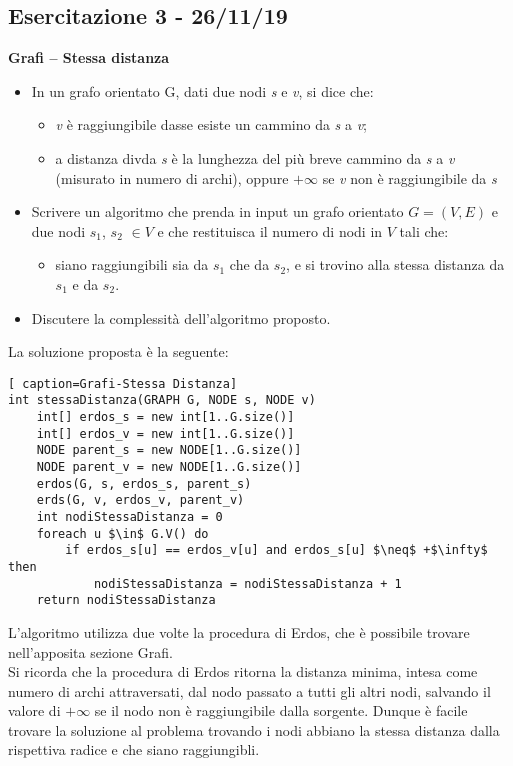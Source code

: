 \documentclass[../cheatSheetAlgoritmi.tex]{subfiles}
\begin{document}
\subsection{Esercitazione 3 - 26/11/19}
\textbf{Grafi – Stessa distanza} \\
\begin{itemize}
\item In un grafo orientato G, dati due nodi \textit{s} e \textit{v}, si dice che:
	\begin{itemize}
		\item \textit{v} è raggiungibile dasse esiste un cammino da \textit{s} a \textit{v};
		\item a distanza divda \textit{s} è la lunghezza del più breve cammino da \textit{s} a \textit{v} (misurato in numero di archi), oppure $+\infty$ se \textit{v} non è raggiungibile da \textit{s}
	\end{itemize}
	
	\item Scrivere un algoritmo che prenda in input un grafo orientato $G=(V, E)$ e due nodi $s_1$, $s_2$ $\in V$ e che restituisca il numero di nodi in $V$ tali che:
	\begin{itemize}
		\item siano raggiungibili sia da $s_1$ che da $s_2$, e si trovino alla stessa distanza da $s_1$ e da $s_2$.
	\end{itemize}
	\item Discutere la complessità dell’algoritmo proposto.
\end{itemize}
La soluzione proposta è la seguente:
\begin{lstlisting}[ caption=Grafi-Stessa Distanza]
int stessaDistanza(GRAPH G, NODE s, NODE v)
	int[] erdos_s = new int[1..G.size()]
  	int[] erdos_v = new int[1..G.size()]
  	NODE parent_s = new NODE[1..G.size()]
 	NODE parent_v = new NODE[1..G.size()]
 	erdos(G, s, erdos_s, parent_s)
 	erds(G, v, erdos_v, parent_v)
  	int nodiStessaDistanza = 0
  	foreach u $\in$ G.V() do
    	if erdos_s[u] == erdos_v[u] and erdos_s[u] $\neq$ +$\infty$ then
      		nodiStessaDistanza = nodiStessaDistanza + 1
  	return nodiStessaDistanza
\end{lstlisting}
L'algoritmo utilizza due volte la procedura di Erdos, che è possibile trovare nell'apposita sezione Grafi. \\ Si ricorda che la procedura di Erdos ritorna la distanza minima, intesa come numero di archi attraversati, dal nodo passato a tutti gli altri nodi, salvando il valore di $+\infty$ se il nodo non è raggiungibile dalla sorgente. Dunque è facile trovare la soluzione al problema trovando i nodi abbiano la stessa distanza dalla rispettiva radice e che siano raggiungibli.
\end{document}

